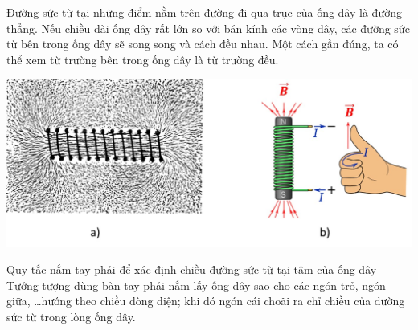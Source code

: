 \begin{tomtat}
\begin{itemize}
		Đường sức từ tại những điểm nằm trên đường đi qua trục của ống dây là đường thẳng. Nếu chiều dài ống dây rất lớn so với bán kính các vòng dây, các đường sức từ bên trong ống dây sẽ song song và cách đều nhau. Một cách gần đúng, ta có thể xem từ trường bên trong ống dây là từ trường đều.
		\begin{center}
			\includegraphics[width=0.6\linewidth]{figs/VN12-Y24-PH-SYL-017-6}
		\end{center}
		\begin{noidung}{Quy tắc nắm tay phải để xác định chiều đường sức từ tại tâm của ống dây}
			Tưởng tượng dùng bàn tay phải nắm lấy ống dây sao cho các ngón trỏ, ngón giữa, \dots hướng theo chiều dòng điện; khi đó ngón cái choãi ra chỉ chiều của đường sức từ trong lòng ống dây.
		\end{noidung}
	\end{itemize}
\end{tomtat}
